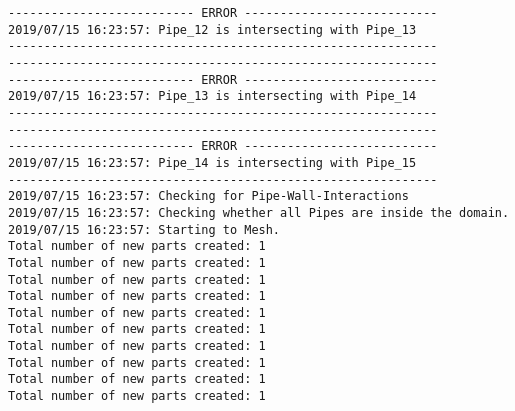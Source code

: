 \documentclass{article}
\begin{document}
{\begin{verbatim}
-------------------------- ERROR ---------------------------
2019/07/15 16:23:57: Pipe_12 is intersecting with Pipe_13
------------------------------------------------------------
------------------------------------------------------------
-------------------------- ERROR ---------------------------
2019/07/15 16:23:57: Pipe_13 is intersecting with Pipe_14
------------------------------------------------------------
------------------------------------------------------------
-------------------------- ERROR ---------------------------
2019/07/15 16:23:57: Pipe_14 is intersecting with Pipe_15
------------------------------------------------------------
2019/07/15 16:23:57: Checking for Pipe-Wall-Interactions
2019/07/15 16:23:57: Checking whether all Pipes are inside the domain.
2019/07/15 16:23:57: Starting to Mesh.
Total number of new parts created: 1
Total number of new parts created: 1
Total number of new parts created: 1
Total number of new parts created: 1
Total number of new parts created: 1
Total number of new parts created: 1
Total number of new parts created: 1
Total number of new parts created: 1
Total number of new parts created: 1
Total number of new parts created: 1
\end{verbatim}
}
\clearpage
\end{document}
